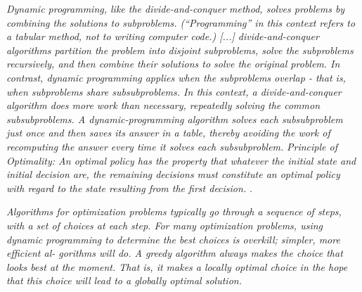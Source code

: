 \begin{definition}
\textit{Dynamic programming, like the divide-and-conquer method, solves problems by combining the solutions to subproblems. (“Programming” in this context refers to a tabular method, not to writing computer code.) [...] divide-and-conquer algorithms partition the problem into disjoint subproblems, solve the subproblems recursively, and then combine their solutions to solve the original problem. In contrast, dynamic programming applies when the subproblems overlap - that is, when subproblems share subsubproblems. In this context, a divide-and-conquer algorithm does more work than necessary, repeatedly solving the common subsubproblems. A dynamic-programming algorithm solves each subsubproblem just once and then saves its answer in a table, thereby avoiding the work of recomputing the answer every time it solves each subsubproblem.} \cite[ch. 15]{cormen2009introduction}  \cite[ch. 3, p. 70]{ahuja1993network}
\textit{Principle of Optimality: An optimal policy has the property that whatever the initial state and initial decision are, the remaining decisions must constitute an optimal policy with regard to the state resulting from the first decision.} \cite[sec. 3.3]{bellman1957dynamic}.
\end{definition}

\begin{definition}[greedy]
\textit{Algorithms for optimization problems typically go through a sequence of steps, with a set of choices at each step. For many optimization problems, using dynamic programming to determine the best choices is overkill; simpler, more efficient al- gorithms will do. A greedy algorithm always makes the choice that looks best at the moment. That is, it makes a locally optimal choice in the hope that this choice will lead to a globally optimal solution.} \cite[ch. 16]{cormen2009introduction} \cite[sec. 13.7, p. 528]{ahuja1993network} \cite[ch. 5]{jungnickel2013graphs}
\end{definition}
